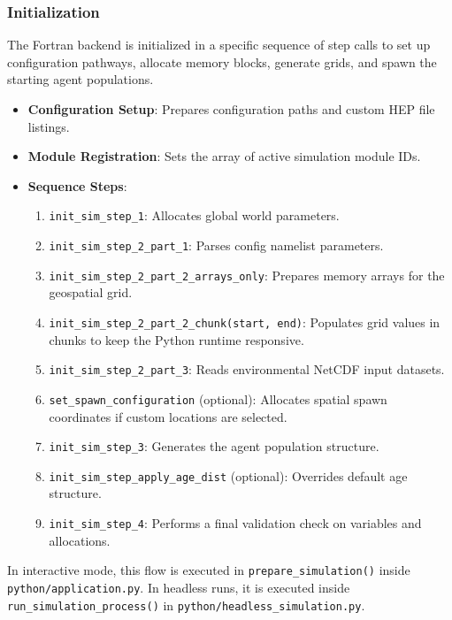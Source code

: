 \subsubsection{Initialization}
The Fortran backend is initialized in a specific sequence of step calls to set up configuration pathways, allocate memory blocks, generate grids, and spawn the starting agent populations.
\begin{itemize}
    \item \textbf{Configuration Setup}: Prepares configuration paths and custom HEP file listings.
    \item \textbf{Module Registration}: Sets the array of active simulation module IDs.
    \item \textbf{Sequence Steps}:
    \begin{enumerate}
        \item \texttt{init\_sim\_step\_1}: Allocates global world parameters.
        \item \texttt{init\_sim\_step\_2\_part\_1}: Parses config namelist parameters.
        \item \texttt{init\_sim\_step\_2\_part\_2\_arrays\_only}: Prepares memory arrays for the geospatial grid.
        \item \texttt{init\_sim\_step\_2\_part\_2\_chunk(start, end)}: Populates grid values in chunks to keep the Python runtime responsive.
        \item \texttt{init\_sim\_step\_2\_part\_3}: Reads environmental NetCDF input datasets.
        \item \texttt{set\_spawn\_configuration} (optional): Allocates spatial spawn coordinates if custom locations are selected.
        \item \texttt{init\_sim\_step\_3}: Generates the agent population structure.
        \item \texttt{init\_sim\_step\_apply\_age\_dist} (optional): Overrides default age structure.
        \item \texttt{init\_sim\_step\_4}: Performs a final validation check on variables and allocations.
    \end{enumerate}
\end{itemize}
In interactive mode, this flow is executed in \texttt{prepare\_simulation()} inside \texttt{python/application.py}. In headless runs, it is executed inside \texttt{run\_simulation\_process()} in \texttt{python/headless\_simulation.py}.

